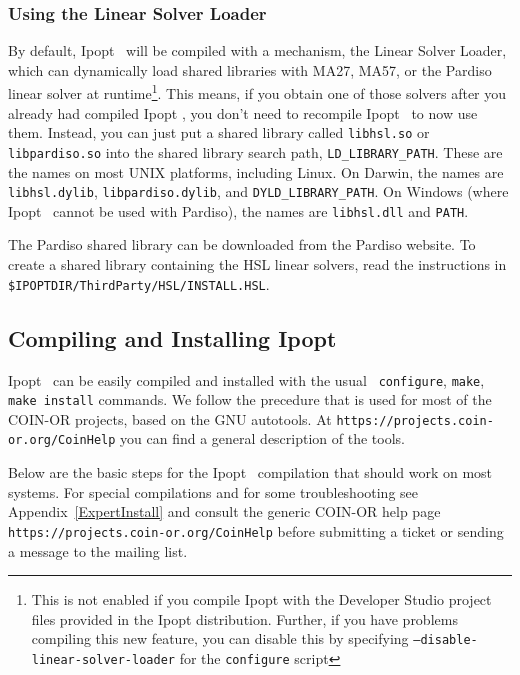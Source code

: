 \documentclass[10pt]{article}
\newcommand{\Ipopt}{{\sc Ipopt }}
\begin{document}
\subsubsection{Using the Linear Solver  Loader}\label{sec:linear_solver_loader}
By default, \Ipopt\ will be compiled with a mechanism, the Linear
Solver Loader, which can dynamically load shared libraries with MA27,
MA57, or the Pardiso linear solver at runtime\footnote{This is not
  enabled if you compile Ipopt with the Developer Studio project files
  provided in the Ipopt distribution.  Further, if you have problems
  compiling this new feature, you can disable this by specifying
  \texttt{--disable-linear-solver-loader} for the \texttt{configure}
  script}. This means, if you obtain one of those solvers after you
already had compiled \Ipopt, you don't need to recompile \Ipopt\ to
now use them.  Instead, you can just put a shared library called
\texttt{libhsl.so} or \texttt{libpardiso.so} into the shared library
search path, \texttt{LD\_LIBRARY\_PATH}.  These are the names on most
UNIX platforms, including Linux.  On Darwin, the names are
\texttt{libhsl.dylib}, \texttt{libpardiso.dylib}, and
\texttt{DYLD\_LIBRARY\_PATH}.  On Windows (where \Ipopt\ cannot be
used with Pardiso), the names are \texttt{libhsl.dll} and \texttt{PATH}.

The Pardiso shared library can be downloaded from the Pardiso website.
To create a shared library containing the HSL linear solvers, read the
instructions in \texttt{\$IPOPTDIR/ThirdParty/HSL/INSTALL.HSL}.

\subsection{Compiling and Installing \Ipopt} \label{sec.comp_and_inst}

\Ipopt\ can be easily compiled and installed with the usual {\tt
  configure}, {\tt make}, {\tt make install} commands.  We follow the
precedure that is used for most of the COIN-OR projects, based on the
GNU autotools.  At \texttt{https://projects.coin-or.org/CoinHelp}
you can find a general description of the tools.

Below are the basic steps for the \Ipopt\ compilation that should work
on most systems.  For special compilations and for some
troubleshooting see Appendix~\ref{ExpertInstall} and consult the
generic COIN-OR help page
\texttt{https://projects.coin-or.org/CoinHelp} before submitting a
ticket or sending a message to the mailing list.
\end{document}
